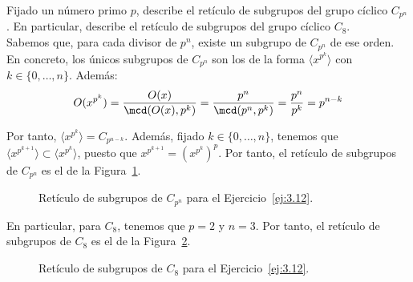\begin{ejercicio}\label{ej:3.12}
    Fijado un número primo $p$, describe el retículo de subgrupos del grupo cíclico $C_{p^n}$. En particular, describe el retículo de subgrupos del grupo cíclico $C_8$.\\

    Sabemos que, para cada divisor de $p^n$, existe un subgrupo de $C_{p^n}$ de ese orden. En concreto, los únicos subgrupos de $C_{p^n}$ son los de la forma $\langle x^{p^k}\rangle$ con $k\in \{0,\ldots,n\}$. Además:
    \begin{equation*}
        O(x^{p^k})=\dfrac{O(x)}{\mcd(O(x),p^k)}=\dfrac{p^n}{\mcd(p^n,p^k)}=\dfrac{p^n}{p^k}=p^{n-k}
    \end{equation*}

    Por tanto, $\langle x^{p^k}\rangle=C_{p^{n-k}}$. Además, fijado $k\in \{0,\ldots,n\}$, tenemos que $\langle x^{p^{k+1}}\rangle\subset \langle x^{p^{k}}\rangle$, puesto que $x^{p^{k+1}}=(x^{p^k})^{p}$.    
    Por tanto, el retículo de subgrupos de $C_{p^n}$ es el de la Figura~\ref{fig:ej12}.
    \begin{figure}
        \centering
        \caption{Retículo de subgrupos de $C_{p^n}$ para el Ejercicio~\ref{ej:3.12}.}
        \label{fig:ej12}
    \end{figure}

    En particular, para $C_8$, tenemos que $p=2$ y $n=3$. Por tanto, el retículo de subgrupos de $C_8$ es el de la Figura~\ref{fig:ej12_8}.
    \begin{figure}
        \centering
        \caption{Retículo de subgrupos de $C_8$ para el Ejercicio~\ref{ej:3.12}.}
        \label{fig:ej12_8}
    \end{figure}
\end{ejercicio}

